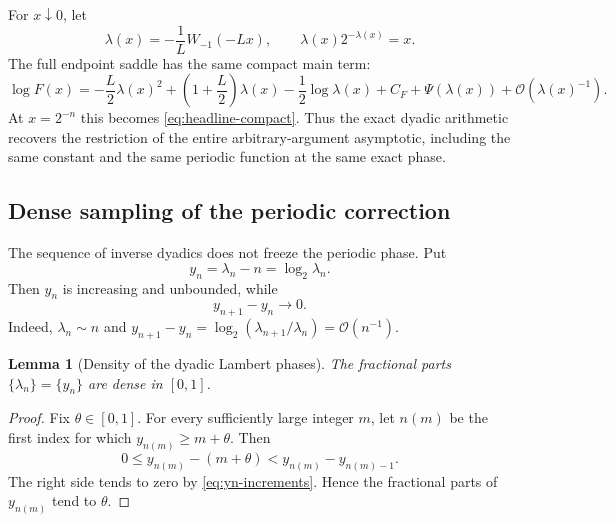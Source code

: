 \documentclass[11pt,oneside]{article}
\newtheorem{lemma}[theorem]{Lemma}
\theoremstyle{definition}
\theoremstyle{remark}
\newcommand{\bigO}{\mathcal O}
\begin{document}
For $x\downarrow0$, let
\begin{equation}
 \lambda(x)=-\frac1L W_{-1}(-Lx),
 \qquad
 \lambda(x)2^{-\lambda(x)}=x.                              \label{eq:lambda-x}
\end{equation}
The full endpoint saddle has the same compact main term:
\begin{equation}
 \log F(x)=
 -\frac L2\lambda(x)^2+
 \left(1+\frac L2\right)\lambda(x)-\frac12\log\lambda(x)
 +C_F+\Psi(\lambda(x))+\bigO(\lambda(x)^{-1}).              \label{eq:general-x-main}
\end{equation}
At $x=2^{-n}$ this becomes \eqref{eq:headline-compact}.  Thus the exact dyadic arithmetic
recovers the restriction of the entire arbitrary-argument asymptotic, including the same
constant and the same periodic function at the same exact phase.

\subsection{Dense sampling of the periodic correction}

The sequence of inverse dyadics does not freeze the periodic phase.  Put
\begin{equation}
 y_n=\lambda_n-n=\log_2\lambda_n.                           \label{eq:yn}
\end{equation}
Then $y_n$ is increasing and unbounded, while
\begin{equation}
 y_{n+1}-y_n\longrightarrow0.                               \label{eq:yn-increments}
\end{equation}
Indeed, $\lambda_n\sim n$ and
$y_{n+1}-y_n=\log_2(\lambda_{n+1}/\lambda_n)=\bigO(n^{-1})$.

\begin{lemma}[Density of the dyadic Lambert phases]
\label{lem:phase-density}
The fractional parts $\{\lambda_n\}=\{y_n\}$ are dense in $[0,1]$.
\end{lemma}

\begin{proof}
Fix $\theta\in[0,1]$.  For every sufficiently large integer $m$, let $n(m)$ be the first
index for which $y_{n(m)}\ge m+\theta$.  Then
\begin{equation*}
 0\le y_{n(m)}-(m+\theta)
 <y_{n(m)}-y_{n(m)-1}.
\end{equation*}
The right side tends to zero by \eqref{eq:yn-increments}.  Hence the fractional parts of
$y_{n(m)}$ tend to $\theta$.
\end{proof}
\end{document}
